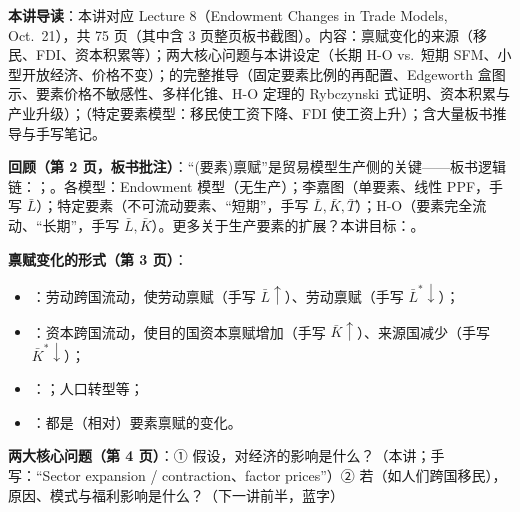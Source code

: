 
\textbf{本讲导读}：本讲对应 Lecture 8（Endowment Changes in Trade Models, Oct.\ 21），共 75 页（其中含 3 页整页板书截图）。内容：禀赋变化的来源（移民、FDI、资本积累等）；两大核心问题与本讲设定（长期 H-O vs.\ 短期 SFM、小型开放经济、价格不变）；的完整推导（固定要素比例的再配置、Edgeworth 盒图示、要素价格不敏感性、多样化锥、H-O 定理的 Rybczynski 式证明、资本积累与产业升级）；（特定要素模型：移民使工资下降、FDI 使工资上升）；含大量板书推导与手写笔记。


\textbf{回顾（第 2 页，板书批注）}：``(要素)禀赋''是贸易模型生产侧的关键——板书逻辑链：；。各模型：Endowment 模型（无生产）；李嘉图（单要素、线性 PPF，手写 $\bar{L}$）；特定要素（不可流动要素、``短期''，手写 $\bar{L}, \bar{K}, \bar{T}$）；H-O（要素完全流动、``长期''，手写 $\bar{L}, \bar{K}$）。更多关于生产要素的扩展？本讲目标：。

\textbf{禀赋变化的形式（第 3 页）}：
\begin{itemize}
  \item {}：劳动跨国流动，使劳动禀赋（手写 $\bar{L} \uparrow$）、劳动禀赋（手写 $\bar{L}^* \downarrow$）；
  \item {}：资本跨国流动，使目的国资本禀赋增加（手写 $\bar{K} \uparrow$）、来源国减少（手写 $\bar{K}^* \downarrow$）；
  \item {}：；人口转型等；
  \item {}：都是（相对）要素禀赋的变化。
\end{itemize}

\textbf{两大核心问题（第 4 页）}：① 假设，对经济的影响是什么？（本讲；手写：``Sector expansion / contraction、factor prices''）② 若（如人们跨国移民），原因、模式与福利影响是什么？（下一讲前半，蓝字）

